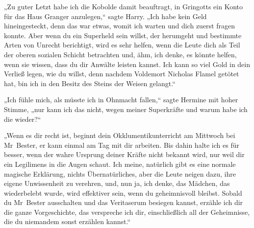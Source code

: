 „Zu guter Letzt habe ich die Kobolde damit beauftragt, in Gringotts ein Konto für das Haus Granger anzulegen,“ sagte Harry. „Ich habe kein Geld hineingesteckt, denn das war etwas, womit ich warten und dich zuerst fragen konnte. Aber wenn du ein Superheld sein willst, der herumgeht und bestimmte Arten von Unrecht berichtigt, wird es sehr helfen, wenn die Leute dich als Teil der oberen sozialen Schicht betrachten und, ähm, ich denke, es könnte helfen, wenn sie wissen, dass du dir Anwälte leisten kannst. Ich kann so viel Gold in dein Verließ legen, wie du willst, denn nachdem Voldemort Nicholas Flamel getötet hat, bin ich in den Besitz des Steins der Weisen gelangt.“

„Ich fühle mich, als müsste ich in Ohnmacht fallen,“ sagte Hermine mit hoher Stimme, „nur kann ich das nicht, wegen meiner Superkräfte und warum habe ich die wieder?“

„Wenn es dir recht ist, beginnt dein Okklumentikunterricht am Mittwoch bei Mr~Bester, er kann einmal am Tag mit dir arbeiten. Bis dahin halte ich es für besser, wenn der wahre Ursprung deiner Kräfte nicht bekannt wird, nur weil dir ein Legilimens in die Augen schaut. Ich meine, natürlich gibt es eine normale magische Erklärung, nichts Übernatürliches, aber die Leute neigen dazu, ihre eigene Unwissenheit zu verehren, und, nun ja, ich denke, das Mädchen, das wiederbelebt wurde, wird effektiver sein, wenn du geheimnisvoll bleibst. Sobald du Mr~Bester ausschalten und das Veritaserum besiegen kannst, erzähle ich dir die ganze Vorgeschichte, das verspreche ich dir, einschließlich all der Geheimnisse, die du niemandem sonst erzählen kannst.“

